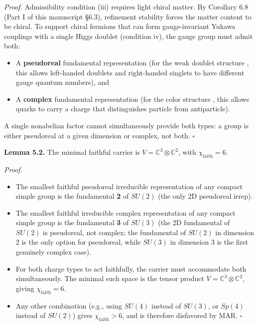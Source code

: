 \emph{Proof.} Admissibility condition (iii) requires light chiral matter. By Corollary 6.8 (Part I of this manuscript §6.3), refinement stability forces the matter content to be chiral. To support chiral fermions that can form gauge-invariant Yukawa couplings with a single Higgs doublet (condition iv), the gauge group must admit both:

\begin{itemize}
\tightlist
\item
  A \textbf{pseudoreal} fundamental representation (for the weak doublet structure , this allows left-handed doublets and right-handed singlets to have different gauge quantum numbers), and
\item
  A \textbf{complex} fundamental representation (for the color structure , this allows quarks to carry a charge that distinguishes particle from antiparticle).
\end{itemize}

A single nonabelian factor cannot simultaneously provide both types: a group is either pseudoreal at a given dimension or complex, not both. \(\square\)

\textbf{Lemma 5.2.} The minimal faithful carrier is \(V = \mathbb{C}^3 \otimes \mathbb{C}^2\), with \(\chi_{\mathrm{faith}} = 6\).

\emph{Proof.}

\begin{itemize}
\tightlist
\item
  The smallest faithful pseudoreal irreducible representation of any compact simple group is the fundamental \textbf{2} of \(SU(2)\) (the only 2D pseudoreal irrep).
\item
  The smallest faithful irreducible complex representation of any compact simple group is the fundamental \textbf{3} of \(SU(3)\) (the 2D fundamental of \(SU(2)\) is pseudoreal, not complex; the fundamental of \(SU(2)\) in dimension 2 is the only option for pseudoreal, while \(SU(3)\) in dimension 3 is the first genuinely complex case).
\item
  For both charge types to act faithfully, the carrier must accommodate both simultaneously. The minimal such space is the tensor product \(V = \mathbb{C}^3 \otimes \mathbb{C}^2\), giving \(\chi_{\mathrm{faith}} = 6\).
\item
  Any other combination (e.g., using \(SU(4)\) instead of \(SU(3)\), or \(Sp(4)\) instead of \(SU(2)\)) gives \(\chi_{\mathrm{faith}} > 6\), and is therefore disfavored by MAR. \(\square\)
\end{itemize}

